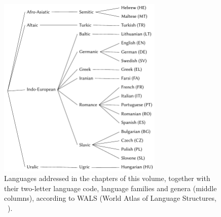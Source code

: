 \documentclass[output=paper,
modfonts,
]{langscibook}
\begin{document}
\begin{figure}
\includegraphics[width=0.70\textwidth]{figures/language-tree.pdf}
\caption{Languages addressed in the chapters of this volume, together with their two-letter language code, language families and genera (middle columns), according to WALS (World Atlas of Language Structures, ~\citealt{wals13}).}
\label{preface:fig:language-tree}
\end{figure}






\end{document}
